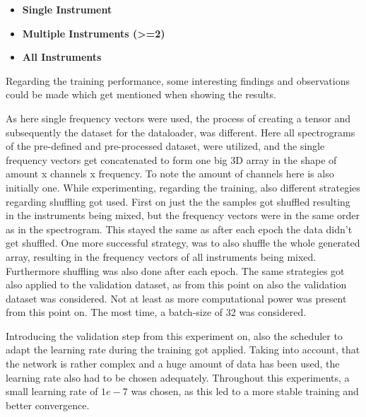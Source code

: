 \begin{itemize}
    \item \textbf{Single Instrument}
    \item \textbf{Multiple Instruments (>=2)}
    \item \textbf{All Instruments}\\
\end{itemize}

\noindent
Regarding the training performance, some interesting findings and observations could be made which get mentioned when showing the results. 

As here single frequency vectors were used, the process of creating a tensor and subsequently the dataset for the dataloader, was different. Here all spectrograms of the pre-defined and pre-processed dataset, were utilized, and the single frequency vectors get concatenated to form one big 3D array in the shape of amount x channels x frequency. To note the amount of channels here is also initially one. While experimenting, regarding the training, also different strategies regarding shuffling got used. First on just the the samples got shuffled resulting in the instruments being mixed, but the frequency vectors were in the same order as in the spectrogram. This stayed the same as after each epoch the data didn't get shuffled. One more successful strategy, was to also shuffle the whole generated array, resulting in the frequency vectors of all instruments being mixed. Furthermore shuffling was also done after each epoch. The same strategies got also applied to the validation dataset, as from this point on also the validation dataset was considered. Not at least as more computational power was present from this point on. The most time, a batch-size of 32 was considered. 

Introducing the validation step from this experiment on, also the scheduler to adapt the learning rate during the training got applied. Taking into account, that the network is rather complex and a huge amount of data has been used, the learning rate also had to be chosen adequately. Throughout this experiments, a small learning rate of $1e-7$ was chosen, as this led to a more stable training and better convergence. 

